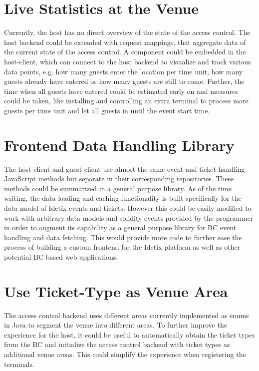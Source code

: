 \section{Live Statistics at the Venue}
Currently, the host has no direct overview of the state of the access control. The host backend could be extended with request mappings, that aggregate data of the current state of the access control. A component could be embedded in the host-client, which can connect to the host backend to visualize and track various data points, e.g. how many guests enter the location per time unit, how many guests already have entered or how many guests are still to come. Further, the time when all guests have entered could be estimated early on and measures could be taken, like installing and controlling an extra terminal to process more guests per time unit and let all guests in until the event start time.

\section{Frontend Data Handling Library}
The host-client and guest-client use almost the same event and ticket handling JavaScript methods but separate in their corresponding repositories. These methods could be summarized in a general purpose library. As of the time writing, the data loading and caching functionality is built specifically for the data model of Idetix events and tickets. However this could be easily modified to work with arbitrary data models and solidity events provided by the programmer in order to augment its capability as a general purpose library for BC event handling and data fetching. This would provide more code to further ease the process of building a custom frontend for the Idetix platform as well as other potential BC based web applications. 

\section{Use Ticket-Type as Venue Area}
The access control backend uses different areas currently implemented as enums in Java to segment the venue into different areas. To further improve the experience for the host, it could be useful to automatically obtain the ticket types from the BC and initialize the access control backend with ticket types as additional venue areas. This could simplify the experience when registering the terminals.

